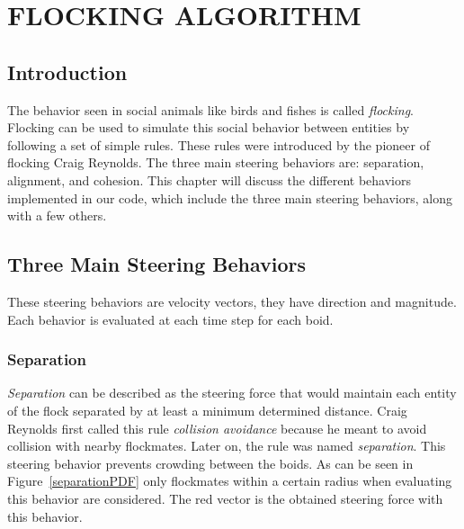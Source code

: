 \chapter{FLOCKING ALGORITHM}\label{chap3}

\section{Introduction}
The behavior seen in social animals like birds and fishes is called \textit{flocking}. Flocking can be used to simulate this social behavior between entities by following a set of simple rules. These rules were introduced by the pioneer of flocking Craig Reynolds\cite{craig1}. The three main steering behaviors are: separation, alignment, and cohesion. This chapter will discuss the different behaviors implemented in our code, which include the three main steering behaviors, along with a few others.

\section{Three Main Steering Behaviors}
These steering behaviors are velocity vectors, they have direction and magnitude. Each behavior is evaluated at each time step for each boid.

\subsection{Separation}\label{separationsection}
\textit{Separation} can be described as the steering force that would maintain each entity of the flock separated by at least a minimum determined distance. Craig Reynolds first called this rule \textit{collision avoidance} because he meant to avoid collision with nearby flockmates. Later on, the rule was named \textit{separation}. This steering behavior prevents crowding between the boids. As can be seen in Figure~\ref{separationPDF} only flockmates within a certain radius when evaluating this behavior are considered. The red vector is the obtained steering force with this behavior.

